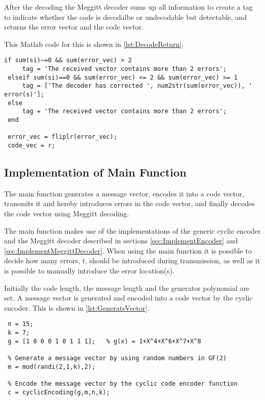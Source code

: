 \documentclass[Main]{subfiles}
\begin{document}
After the decoding the Meggitt decoder sums up all information to create a tag to indicate whether the code is decodalbe or undecodable but detectable, and returns the error vector and the code vector.

This Matlab code for this is shown in \codeTitle \ref{lst:DecodeReturn}.

\begin{lstlisting}[caption=Meggitt Decoder's Return, style=Code-Matlab, label=lst:DecodeReturn]
 if sum(si)~=0 && sum(error_vec) > 2
     tag = 'The received vector contains more than 2 errors';
 elseif sum(si)==0 && sum(error_vec) <= 2 && sum(error_vec) >= 1
     tag = ['The decoder has corrected ', num2str(sum(error_vec)), ' error(s)'];
 else
     tag = 'The received vector contains more than 2 errors';
 end
 
 error_vec = fliplr(error_vec);
 code_vec = r;
\end{lstlisting}








\subsection{Implementation of Main Function}
The main function generates a message vector, encodes it into a code vector, transmits it and hereby introduces errors in the code vector, and finally decodes the code vector using Meggitt decoding.

The main function makes use of the implementations of the generic cyclic encoder and the Meggitt decoder described in sections \ref{sec:ImplementEncoder} and \ref{sec:ImplementMeggittDecoder}. 
When using the main function it is possible to decide how many errors, $t$, should be introduced during transmission, as well as it is possible to manually introduce the error location(s).

Initially the code length, the message length and the generator polynomial are set. A message vector is generated and encoded into a code vector by the cyclic encoder. This is shown in \codeTitle \ref{lst:GenerateVector}. 

\begin{lstlisting}[caption=Generating and Encoding a Vector, style=Code-Matlab, label=lst:GenerateVector]
 % Set the code length, message length and the generator polynomial
 n = 15;
 k = 7;
 g = [1 0 0 0 1 0 1 1 1];   % g(x) = 1+X^4+X^6+X^7+X^8

 % Generate a message vector by using random numbers in GF(2)
 m = mod(randi(2,1,k),2);

 % Encode the message vector by the cyclic code encoder function
 c = cyclicEncoding(g,m,n,k);
\end{lstlisting}
\end{document}
